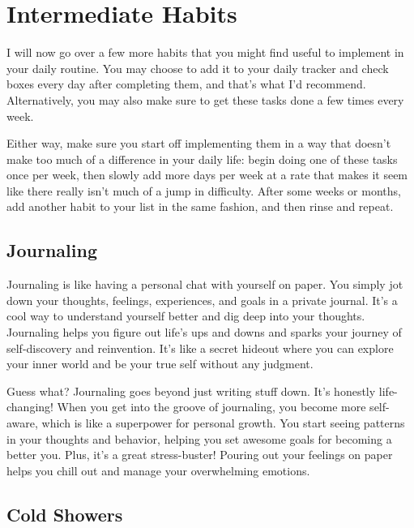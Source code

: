 \documentclass[
]{book}
\begin{document}
\hypertarget{intermediate-habits}{%
\chapter{Intermediate Habits}\label{intermediate-habits}}

I will now go over a few more habits that you might find useful to implement in your daily routine. You may choose to add it to your daily tracker and check boxes every day after completing them, and that's what I'd recommend. Alternatively, you may also make sure to get these tasks done a few times every week.

Either way, make sure you start off implementing them in a way that doesn't make too much of a difference in your daily life: begin doing one of these tasks once per week, then slowly add more days per week at a rate that makes it seem like there really isn't much of a jump in difficulty. After some weeks or months, add another habit to your list in the same fashion, and then rinse and repeat.

\hypertarget{journaling}{%
\section{Journaling}\label{journaling}}

Journaling is like having a personal chat with yourself on paper. You simply jot down your thoughts, feelings, experiences, and goals in a private journal. It's a cool way to understand yourself better and dig deep into your thoughts. Journaling helps you figure out life's ups and downs and sparks your journey of self-discovery and reinvention. It's like a secret hideout where you can explore your inner world and be your true self without any judgment.

Guess what? Journaling goes beyond just writing stuff down. It's honestly life-changing! When you get into the groove of journaling, you become more self-aware, which is like a superpower for personal growth. You start seeing patterns in your thoughts and behavior, helping you set awesome goals for becoming a better you. Plus, it's a great stress-buster! Pouring out your feelings on paper helps you chill out and manage your overwhelming emotions.

\hypertarget{cold-showers}{%
\section{Cold Showers}\label{cold-showers}}
\end{document}
